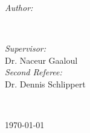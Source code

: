 \begin{titlepage}

\begin{minipage}{0.4\textwidth}
\begin{flushleft} \large
\emph{Author:}\\
\@author %
\end{flushleft}
\end{minipage}
~
\begin{minipage}{0.4\textwidth}
\begin{flushright} \large
\emph{Supervisor:} \\
Dr. Naceur Gaaloul \\[1.2em] %
\emph{Second Referee:} \\
Dr. Dennis Schlippert %
\end{flushright}
\end{minipage}\\[2cm]
\makeatother


{\large \today}\\[2cm] %

\vfill %

\end{titlepage}